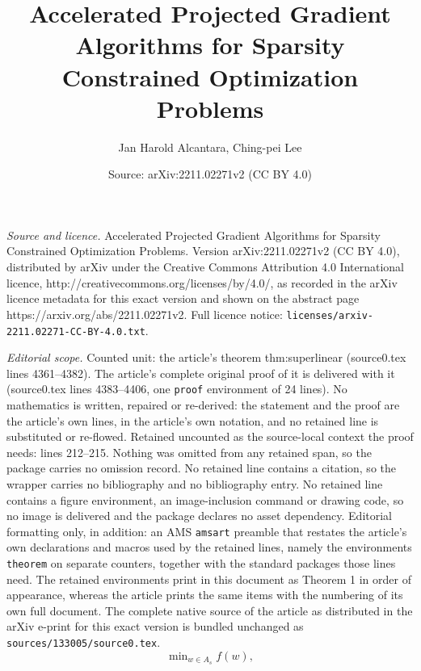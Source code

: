 \documentclass[10pt,a4paper]{amsart}
\title{Accelerated Projected Gradient Algorithms for Sparsity Constrained Optimization Problems}
\author{Jan Harold Alcantara, Ching-pei Lee}
\date{Source: arXiv:2211.02271v2 (CC BY 4.0)}
\begin{document}
\maketitle

\noindent\emph{Source and licence.} Accelerated Projected Gradient Algorithms for Sparsity Constrained Optimization Problems. Version arXiv:2211.02271v2 (CC BY 4.0), distributed by arXiv under the Creative Commons Attribution 4.0 International licence, http://creativecommons.org/licenses/by/4.0/, as recorded in the arXiv licence metadata for this exact version and shown on the abstract page https://arxiv.org/abs/2211.02271v2. Full licence notice: \texttt{licenses/arxiv-2211.02271-CC-BY-4.0.txt}.\par\smallskip

\noindent\textit{Editorial scope.} Counted unit: the article's theorem thm:superlinear (source0.tex lines 4361--4382). The article's complete original proof of it is delivered with it (source0.tex lines 4383--4406, one \texttt{proof} environment of 24 lines). No mathematics is written, repaired or re-derived: the statement and the proof are the article's own lines, in the article's own notation, and no retained line is substituted or re-flowed.  Retained uncounted as the source-local context the proof needs: lines 212--215.  Nothing was omitted from any retained span, so the package carries no omission record.  No retained line contains a citation, so the wrapper carries no bibliography and no bibliography entry.  No retained line contains a figure environment, an image-inclusion command or drawing code, so no image is delivered and the package declares no asset dependency.  Editorial formatting only, in addition: an AMS \texttt{amsart} preamble that restates the article's own declarations and macros used by the retained lines, namely the environments \texttt{theorem} on separate counters, together with the standard packages those lines need.  The retained environments print in this document as Theorem 1 in order of appearance, whereas the article prints the same items with the numbering of its own full document.  The complete native source of the article as distributed in the arXiv e-print for this exact version is bundled unchanged as \texttt{sources/133005/source0.tex}.
	\begin{equation}
	\label{eq:problem}
	\min\nolimits _{w \in A_s} f(w),
	\end{equation}
\end{document}
